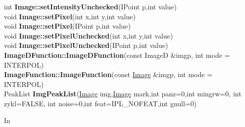 \documentclass[10pt,titlepage]{article}
\def\functionlistentry#1#2#3#4#5#6{\noindent #1 {\bf #2}(#3) \dotfill #6\\}
\def\letterref#1{}
\def\letterlabel#1{\vspace{0.5cm}\centerline{\Large #1}}
\begin{document}
{{\functionlistentry{int}{Image::setIntensityUnchecked}{IPoint p,int value}{57}{Images}{}
\functionlistentry{void}{Image::setPixel}{int x,int y,int value}{46}{Images}{}
\functionlistentry{void}{Image::setPixel}{IPoint p,int value}{47}{Images}{}
\functionlistentry{void}{Image::setPixelUnchecked}{int x,int y,int value}{50}{Images}{}
\functionlistentry{void}{Image::setPixelUnchecked}{IPoint p,int value}{51}{Images}{}
\functionlistentry{}{ImageDFunction::ImageDFunction}{const ImageD \&imgp, int mode = INTERPOL}{1062}{functions}{}
\functionlistentry{}{ImageFunction::ImageFunction}{const \hyperlink{Image}{Image} \&imgp, int mode = INTERPOL}{1061}{functions}{}
\functionlistentry{PeakList}{ImgPeakList}{\hyperlink{Image}{Image} img,\hyperlink{Image}{Image} mark,int panz=0,int mingrw=0, int zykl=FALSE, int noise=0,int feat=IPL\_NOFEAT,int gnull=0}{1258}{registration}{}

\letterlabel{In}
\letterref{A}
\letterref{B}
\letterref{C}
\letterref{D}
\letterref{E}
\letterref{F}
\letterref{G}
\letterref{H}
\letterref{I}
\letterref{K}
\letterref{L}
\letterref{M}
\letterref{N}
\letterref{O}
\letterref{P}
\letterref{Q}
\letterref{R}
\letterref{S}
\letterref{T}
\letterref{U}
\letterref{V}
\letterref{W}
\letterref{X}
\letterref{Y}
\letterref{Z}

}}
\end{document}
